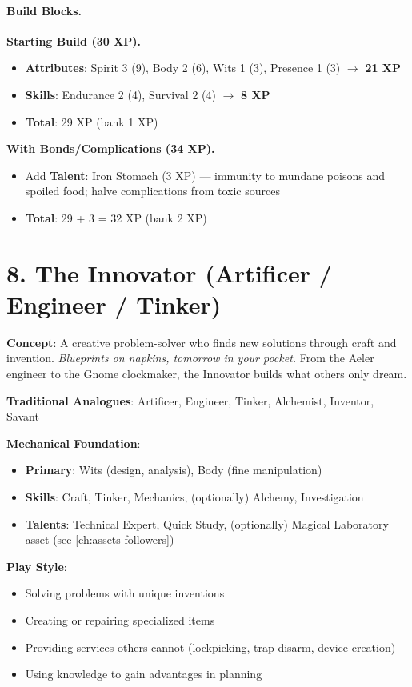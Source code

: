 \paragraph{Build Blocks.}
\textbf{Starting Build (30 XP).}
\begin{itemize}
\item \textbf{Attributes}: Spirit 3 (9), Body 2 (6), Wits 1 (3), Presence 1 (3) $\rightarrow$ \textbf{21 XP}
\item \textbf{Skills}: Endurance 2 (4), Survival 2 (4) $\rightarrow$ \textbf{8 XP}
\item \textbf{Total}: 29 XP (bank 1 XP)
\end{itemize}
\textbf{With Bonds/Complications (34 XP).}
\begin{itemize}
\item Add \textbf{Talent}: Iron Stomach (3 XP) — immunity to mundane poisons and spoiled food; halve complications from toxic sources
\item \textbf{Total}: 29 + 3 = 32 XP (bank 2 XP)
\end{itemize}

\section{8. The Innovator (Artificer / Engineer / Tinker)}
\label{sec:concept-innovator}

\textbf{Concept}: A creative problem-solver who finds new solutions through craft and invention. \emph{Blueprints on napkins, tomorrow in your pocket.} From the Aeler engineer to the Gnome clockmaker, the Innovator builds what others only dream.

\textbf{Traditional Analogues}: Artificer, Engineer, Tinker, Alchemist, Inventor, Savant

\textbf{Mechanical Foundation}:
\begin{itemize}
\item \textbf{Primary}: Wits (design, analysis), Body (fine manipulation)
\item \textbf{Skills}: Craft, Tinker, Mechanics, (optionally) Alchemy, Investigation
\item \textbf{Talents}: Technical Expert, Quick Study, (optionally) Magical Laboratory asset (see \ref{ch:assets-followers})
\end{itemize}

\textbf{Play Style}:
\begin{itemize}
\item Solving problems with unique inventions
\item Creating or repairing specialized items
\item Providing services others cannot (lockpicking, trap disarm, device creation)
\item Using knowledge to gain advantages in planning
\end{itemize}

